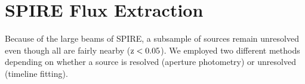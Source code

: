 \section{SPIRE Flux Extraction}\label{photom}
Because of the large beams of SPIRE, a subsample of sources remain unresolved even though all are fairly nearby ($\rm{z} < 0.05$).  We employed two different methods depending on whether a source is resolved (aperture photometry) or unresolved (timeline fitting). 
 